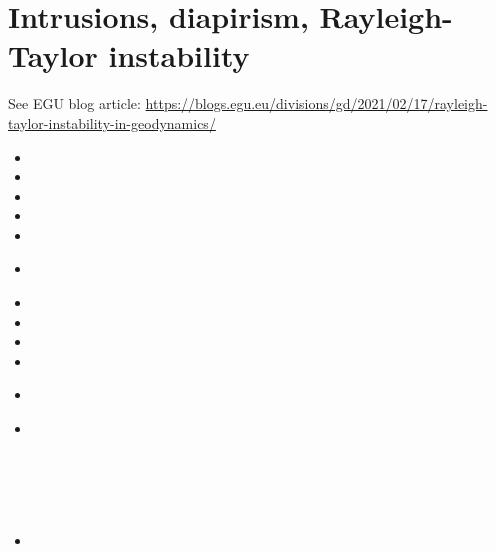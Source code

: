 \section{Intrusions, diapirism, Rayleigh-Taylor instability}

See EGU blog article: 
\url{https://blogs.egu.eu/divisions/gd/2021/02/17/rayleigh-taylor-instability-in-geodynamics/}

\begin{small}
\begin{itemize}
\item[\nineteensixtyfive] 
\item[\nineteensixtyeight] 
\item[\nineteenseventytwo] 
\item[\nineteenseventyfive] 
\item[\nineteenseventyeight] 
\item[\nineteeneighty] 
 \\
\item[\nineteeneightyone] 
\item[\nineteeneightythree] 
\item[\nineteeneightysix] 
\item[\nineteeneightyseven] 
\item[\nineteeneightyeight] 
 \\
\item[\nineteenninetytwo] 
 \\
 \\
 \\
 \\
 \\
\item[\nineteenninetythree] 
 \\
 \\
 \\
 \\
 \\
 \\

\end{itemize}
\end{small}
